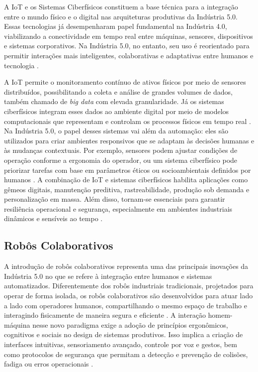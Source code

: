 A \gls{IoT} e os Sistemas Ciberfísicos constituem a base técnica para a integração entre o mundo físico e o digital nas arquiteturas produtivas da Indústria 5.0.
Essas tecnologias já desempenharam papel fundamental na Indústria 4.0, viabilizando a conectividade em tempo real entre máquinas, sensores, dispositivos e sistemas corporativos.
Na Indústria 5.0, no entanto, seu uso é reorientado para permitir interações mais inteligentes, colaborativas e adaptativas entre humanos e tecnologia \cite{VALETTE2023, PIZON2023}.

A IoT permite o monitoramento contínuo de ativos físicos por meio de sensores distribuídos, possibilitando a coleta e análise de grandes volumes de dados, também chamado de \textit{big data} com elevada granularidade.
Já os sistemas ciberfísicos integram esses dados ao ambiente digital por meio de modelos computacionais que representam e controlam os processos físicos em tempo real \cite{TOTH2023}.
Na Indústria 5.0, o papel desses sistemas vai além da automação: eles são utilizados para criar ambientes responsivos que se adaptam às decisões humanas e às mudanças contextuais.
Por exemplo, sensores podem ajustar condições de operação conforme a ergonomia do operador, ou um sistema ciberfísico pode priorizar tarefas com base em parâmetros éticos ou socioambientais definidos por humanos \cite{TOTH2023}.
A combinação de \gls{IoT} e sistemas ciberfísicos habilita aplicações como gêmeos digitais, manutenção preditiva, rastreabilidade, produção sob demanda e personalização em massa.
Além disso, tornam-se essenciais para garantir resiliência operacional e segurança, especialmente em ambientes industriais dinâmicos e sensíveis ao tempo \cite{VALETTE2023}.

\subsection{Robôs Colaborativos}

A introdução de robôs colaborativos representa uma das principais inovações da Indústria 5.0 no que se refere à integração entre humanos e sistemas automatizados.
Diferentemente dos robôs industriais tradicionais, projetados para operar de forma isolada, os robôs colaborativos são desenvolvidos para atuar lado a lado com operadores humanos, compartilhando o mesmo espaço de trabalho e interagindo fisicamente de maneira segura e eficiente \cite{PIZON2023, TOTH2023}.
A interação homem-máquina nesse novo paradigma exige a adoção de princípios ergonômicos, cognitivos e sociais no design de sistemas produtivos.
Isso implica a criação de interfaces intuitivas, sensoriamento avançado, controle por voz e gestos, bem como protocolos de segurança que permitam a detecção e prevenção de colisões, fadiga ou erros operacionais \cite{TOTH2023, YANG2024}.

